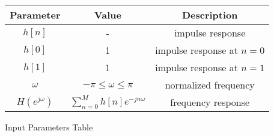 \centering
\begin{tabular}{|c|c|c|}
	\hline
	\textbf{Parameter} & \textbf{Value} & \textbf{Description} \\
	\hline
	$h[n]$ & - & impulse response \\
	\hline
	$h[0]$ & 1 & impulse response at $n=0$ \\
	\hline
	$h[1]$ & 1 & impulse response at $n=1$ \\
	\hline
	$\omega$ & $-\pi\leq\omega\leq\pi$ & normalized frequency \\
	\hline
	$H(e^{j\omega})$ & $\sum_{n=0}^{M} h[n]e^{-jn\omega}$ & frequency response \\
    	\hline
\end{tabular}
\caption{Input Parameters Table}
\label{tab:1}

